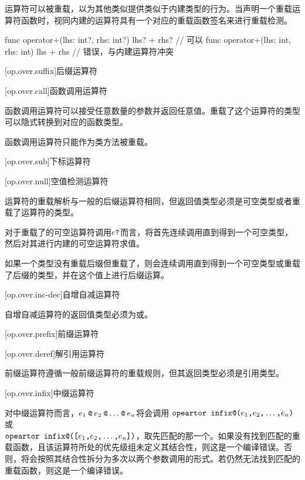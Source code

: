 \pnum
运算符可以被重载，以为其他类似提供类似于内建类型的行为。当声明一个重载运算符函数时，视同内建的运算符具有一个对应的重载函数签名来进行重载检测。

\enterexample
\begin{codeblock}
func operator+(lhs: int?, rhs: int?) { lhs? + rhs? } // 可以
func operator+(lhs: int, rhs: int) { lhs + rhs } // 错误，与内建运算符冲突
\end{codeblock}
\exitexample

[op.over.suffix]{后缀运算符}

[op.over.call]{函数调用运算符}

\pnum
函数调用运算符可以接受任意数量的参数并返回任意值。重载了这个运算符的类型可以隐式转换到对应的函数类型。

\pnum
函数调用运算符只能作为类方法被重载。

[op.over.sub]{下标运算符}

[op.over.null]{空值检测运算符}

\pnum
{}运算符的重载解析与一般的后缀运算符相同，但返回值类型必须是可空类型或者重载了运算符的类型。

\pnum
对于重载了的可空运算符调用$e\texttt{?}$而言，将首先连续调用直到得到一个可空类型，然后对其进行内建的可空运算符求值。

\pnum
如果一个类型没有重载后缀\tcode{!}但重载了，则会连续调用直到得到一个可空类型或重载了后缀\tcode{!}的类型，并在这个值上进行后缀\tcode{!}运算。

[op.over.inc-dec]{自增自减运算符}

\pnum
自增自减运算符的返回值类型必须为或。

[op.over.prefix]{前缀运算符}

[op.over.deref]{解引用运算符}

\pnum
前缀\tcode{\&}运算符遵循一般前缀运算符的重载规则，但其返回类型必须是引用类型。

[op.over.infix]{中缀运算符}

\pnum
对中缀运算符而言，$e_1\mathbin{\texttt{@}}e_2\mathbin{\texttt{@}}\ldots\mathbin{\texttt{@}}e_n$将会调用
$\texttt{opeartor infix@(}e_1\texttt{,}e_2\texttt{,}\ldots\texttt{,}e_n\texttt{)}$或\\$\texttt{opeartor infix@([}e_1\texttt{,}e_2\texttt{,}\ldots\texttt{,}e_n\texttt{])}$，取先匹配的那一个。如果没有找到匹配的重载函数，且该运算符所处的优先级组未定义其结合性，则这是一个编译错误。否则，将会按照其结合性拆分为多次以两个参数调用的形式。若仍然无法找到匹配的重载函数，则这是一个编译错误。

